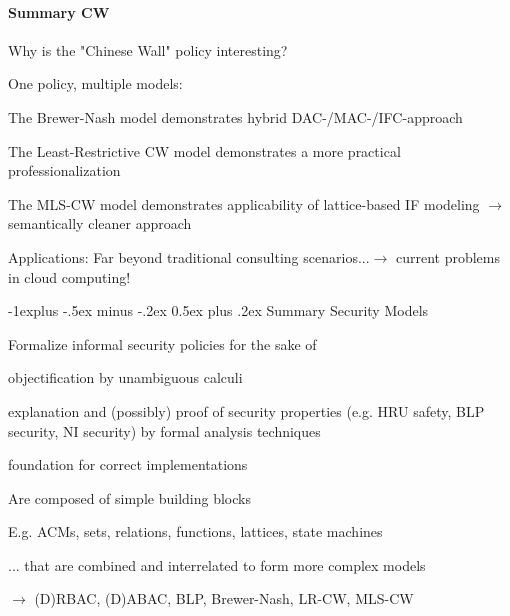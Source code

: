 \documentclass[a4paper]{article}
\makeatletter
\renewcommand{\subsection}{\@startsection{subsection}{2}{0mm}%
                                {-1explus -.5ex minus -.2ex}%
                                {0.5ex plus .2ex}%
                                {\normalfont\normalsize\bfseries}}
\makeatother
\begin{document}
\begin{multicols}{3}
    \paragraph{Summary CW}
    Why is the "Chinese Wall" policy interesting?
    \begin{itemize*}
        \item One policy, multiple models:
              \begin{itemize*}
                  \item The Brewer-Nash model demonstrates hybrid DAC-/MAC-/IFC-approach
                  \item The Least-Restrictive CW model demonstrates a more practical professionalization
                  \item The MLS-CW model demonstrates applicability of lattice-based IF modeling $\rightarrow$ semantically cleaner approach
              \end{itemize*}
        \item Applications: Far beyond traditional consulting scenarios...$\rightarrow$ current problems in cloud computing!
    \end{itemize*}


    \subsection{Summary}
    Security Models
    \begin{itemize*}
        \item Formalize informal security policies for the sake of
              \begin{itemize*}
                  \item objectification by unambiguous calculi
                  \item explanation and (possibly) proof of security properties (e.g. HRU safety, BLP security, NI security) by formal analysis techniques
                  \item foundation for correct implementations
              \end{itemize*}
        \item Are composed of simple building blocks
              \begin{itemize*}
                  \item E.g. ACMs, sets, relations, functions, lattices, state machines
                  \item ... that are combined and interrelated to form more complex models
                  \item $\rightarrow$ (D)RBAC, (D)ABAC, BLP, Brewer-Nash, LR-CW, MLS-CW
              \end{itemize*}
    \end{itemize*}


\end{multicols}
\end{document}
